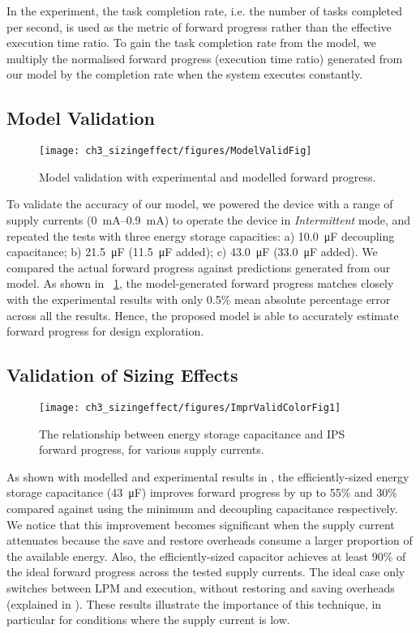 In the experiment, the task completion rate, i.e. the number of tasks completed per second, is used as the metric of forward progress rather than the effective execution time ratio. 
To gain the task completion rate from the model, we multiply the normalised forward progress (execution time ratio) generated from our model by the completion rate when the system executes constantly. 

\subsection{Model Validation} 

\begin{figure}
	\centering
	\texttt{[image: ch3\_sizingeffect/figures/ModelValidFig]}
	\caption{Model validation with experimental and modelled forward progress. }
	\label{fig:modelvalid}
\end{figure}

To validate the accuracy of our model, we powered the device with a range of supply currents (\SIrange{0}{0.9}{\milli\ampere}) to operate the device in \textit{Intermittent} mode, and repeated the tests with three energy storage capacities: a) \SI{10.0}{\micro\farad} decoupling capacitance; b) \SI{21.5}{\micro\farad} (\SI{11.5}{\micro\farad} added); c) \SI{43.0}{\micro\farad} (\SI{33.0}{\micro\farad} added).
We compared the actual forward progress against predictions generated from our model. 
As shown in \figurename{~\ref{fig:modelvalid}}, the model-generated forward progress matches closely with the experimental results with only 0.5\% mean absolute percentage error across all the results. 
Hence, the proposed model is able to accurately estimate forward progress for design exploration. 

\subsection{Validation of Sizing Effects}

\begin{figure}
    \centering
    \texttt{[image: ch3\_sizingeffect/figures/ImprValidColorFig1]}
    \caption{The relationship between energy storage capacitance and IPS forward progress, for various supply currents. }
    \label{fig:imprvalid1}
\end{figure}

As shown with modelled and experimental results in , the efficiently-sized energy storage capacitance (\SI{43}{\micro\farad}) improves forward progress by up to 55\% and 30\% compared against using the minimum and decoupling capacitance respectively. 
We notice that this improvement becomes significant when the supply current attenuates because the save and restore overheads consume a larger proportion of the available energy. 
Also, the efficiently-sized capacitor achieves at least 90\% of the ideal forward progress across the tested supply currents.
The ideal case only switches between LPM and execution, without restoring and saving overheads (explained in ). 
These results illustrate the importance of this technique, in particular for conditions where the supply current is low.
